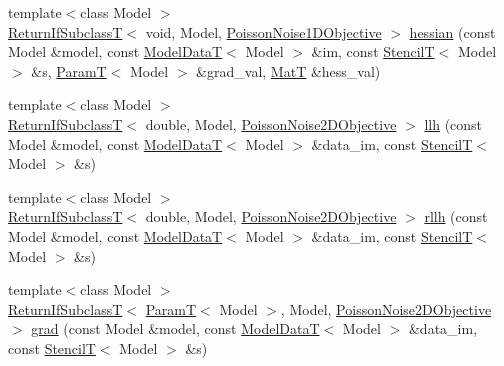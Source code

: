 \begin{DoxyCompactItemize}
\item 
{\footnotesize template$<$class Model $>$ }\\\hyperlink{namespacemappel_a3b77d227658ba3ba9e16fea6fa6e626d}{Return\+If\+SubclassT}$<$ void, Model, \hyperlink{classmappel_1_1PoissonNoise1DObjective}{Poisson\+Noise1\+D\+Objective} $>$ \hyperlink{namespacemappel_1_1methods_1_1likelihood_a0233341d03d8f8d06cb852068942ba73}{hessian} (const Model \&model, const \hyperlink{namespacemappel_a97f050df953605381ae9c901c3b125f1}{Model\+DataT}$<$ Model $>$ \&im, const \hyperlink{namespacemappel_a3a06598240007876f8c4bf834ad86197}{StencilT}$<$ Model $>$ \&s, \hyperlink{namespacemappel_a667925cb0d6c0e49f2f035cc5a9a6857}{ParamT}$<$ Model $>$ \&grad\+\_\+val, \hyperlink{namespacemappel_a7091ab87c528041f7e2027195fad8915}{MatT} \&hess\+\_\+val)
\item 
{\footnotesize template$<$class Model $>$ }\\\hyperlink{namespacemappel_a3b77d227658ba3ba9e16fea6fa6e626d}{Return\+If\+SubclassT}$<$ double, Model, \hyperlink{classmappel_1_1PoissonNoise2DObjective}{Poisson\+Noise2\+D\+Objective} $>$ \hyperlink{namespacemappel_1_1methods_1_1likelihood_a134b4c6ce6807f342f33464e99512dc6}{llh} (const Model \&model, const \hyperlink{namespacemappel_a97f050df953605381ae9c901c3b125f1}{Model\+DataT}$<$ Model $>$ \&data\+\_\+im, const \hyperlink{namespacemappel_a3a06598240007876f8c4bf834ad86197}{StencilT}$<$ Model $>$ \&s)
\item 
{\footnotesize template$<$class Model $>$ }\\\hyperlink{namespacemappel_a3b77d227658ba3ba9e16fea6fa6e626d}{Return\+If\+SubclassT}$<$ double, Model, \hyperlink{classmappel_1_1PoissonNoise2DObjective}{Poisson\+Noise2\+D\+Objective} $>$ \hyperlink{namespacemappel_1_1methods_1_1likelihood_aa8cbdb607db58f763a8dc70ef48372f1}{rllh} (const Model \&model, const \hyperlink{namespacemappel_a97f050df953605381ae9c901c3b125f1}{Model\+DataT}$<$ Model $>$ \&data\+\_\+im, const \hyperlink{namespacemappel_a3a06598240007876f8c4bf834ad86197}{StencilT}$<$ Model $>$ \&s)
\item 
{\footnotesize template$<$class Model $>$ }\\\hyperlink{namespacemappel_a3b77d227658ba3ba9e16fea6fa6e626d}{Return\+If\+SubclassT}$<$ \hyperlink{namespacemappel_a667925cb0d6c0e49f2f035cc5a9a6857}{ParamT}$<$ Model $>$, Model, \hyperlink{classmappel_1_1PoissonNoise2DObjective}{Poisson\+Noise2\+D\+Objective} $>$ \hyperlink{namespacemappel_1_1methods_1_1likelihood_a708debdd0c44a2bbdcc1deac7d49ab37}{grad} (const Model \&model, const \hyperlink{namespacemappel_a97f050df953605381ae9c901c3b125f1}{Model\+DataT}$<$ Model $>$ \&data\+\_\+im, const \hyperlink{namespacemappel_a3a06598240007876f8c4bf834ad86197}{StencilT}$<$ Model $>$ \&s)

\end{DoxyCompactItemize}
